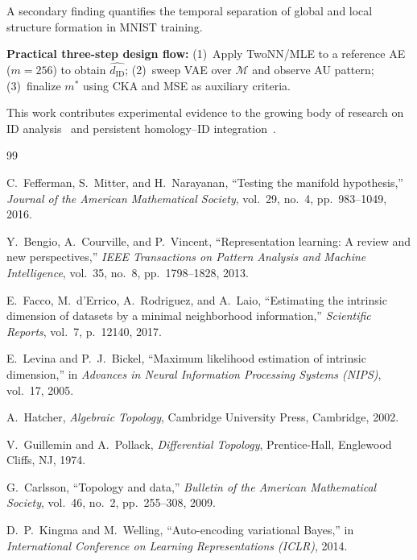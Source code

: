\documentclass[12pt,a4paper]{article}
\newcommand{\dID}{d_{\mathrm{ID}}}
\begin{document}
A secondary finding quantifies the temporal separation of global and local structure formation in MNIST training.

\textbf{Practical three-step design flow:}
(1)~Apply TwoNN/MLE to a reference AE ($m=256$) to obtain $\hat{\dID}$;
(2)~sweep VAE over $\mathcal{M}$ and observe AU pattern;
(3)~finalize $m^*$ using CKA and MSE as auxiliary criteria.

This work contributes experimental evidence to the growing body of research on ID analysis~\cite{ansuini2019intrinsic,valeriani2023geometry} and persistent homology--ID integration~\cite{birdal2021intrinsic,carlsson2009topology}.

\begin{thebibliography}{99}

C.~Fefferman, S.~Mitter, and H.~Narayanan,
``Testing the manifold hypothesis,''
\textit{Journal of the American Mathematical Society}, vol.~29, no.~4,
pp.~983--1049, 2016.

Y.~Bengio, A.~Courville, and P.~Vincent,
``Representation learning: A review and new perspectives,''
\textit{IEEE Transactions on Pattern Analysis and Machine Intelligence},
vol.~35, no.~8, pp.~1798--1828, 2013.

E.~Facco, M.~d'Errico, A.~Rodriguez, and A.~Laio,
``Estimating the intrinsic dimension of datasets by a minimal neighborhood information,''
\textit{Scientific Reports}, vol.~7, p.~12140, 2017.

E.~Levina and P.~J.~Bickel,
``Maximum likelihood estimation of intrinsic dimension,''
in \textit{Advances in Neural Information Processing Systems (NIPS)}, vol.~17, 2005.

A.~Hatcher,
\textit{Algebraic Topology},
Cambridge University Press, Cambridge, 2002.

V.~Guillemin and A.~Pollack,
\textit{Differential Topology},
Prentice-Hall, Englewood Cliffs, NJ, 1974.

G.~Carlsson,
``Topology and data,''
\textit{Bulletin of the American Mathematical Society},
vol.~46, no.~2, pp.~255--308, 2009.

D.~P.~Kingma and M.~Welling,
``Auto-encoding variational Bayes,''
in \textit{International Conference on Learning Representations (ICLR)}, 2014.


\end{thebibliography}
\end{document}
